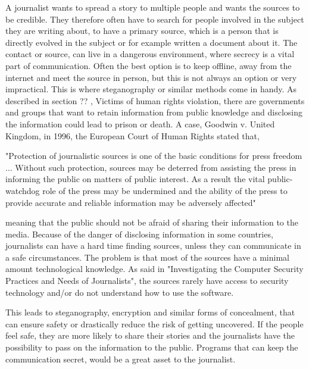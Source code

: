 A journalist wants to spread a story to multiple people and wants the sources to be credible. They therefore often have to search for people involved in the subject they are writing about, to have a primary source, which is a person that is directly evolved in the subject or for example written a document about it. The contact or source, can live in a dangerous environment, where secrecy is a vital part of communication. Often the best option is to keep offline, away from the internet and meet the source in person, but this is not always an option or very impractical.\cite{secret} This is where steganography or similar methods come in handy. As described in section ?? , Victims of human rights violation, there are governments and groups that want to retain information from public knowledge and disclosing the information could lead to prison or death. A case, Goodwin v. United Kingdom, in 1996, the European Court of Human Rights stated that, 

"Protection of journalistic sources is one of the basic conditions for press freedom ... Without such protection, sources may be deterred from assisting the press in informing the public on matters of public interest. As a result the vital public-watchdog role of the press may be undermined and the ability of the press to provide accurate and reliable information may be adversely affected"\cite{case}

meaning that the public should not be afraid of sharing their information to the media. Because of the danger of disclosing information in some countries, journalists can have a hard time finding sources, unless they can communicate in a safe circumstances. The problem is that most of the sources have a minimal amount technological knowledge. As said in "Investigating the Computer Security Practices and Needs of Journalists", the sources rarely have access to security technology and/or do not understand how to use the software. 

This leads to steganography, encryption and similar forms of concealment, that can ensure safety or drastically reduce the risk of getting uncovered. If the people feel safe, they are more likely to share their stories and the journalists have the possibility to pass on the information to the public. Programs that can keep the communication secret, would be a great asset to the journalist. 